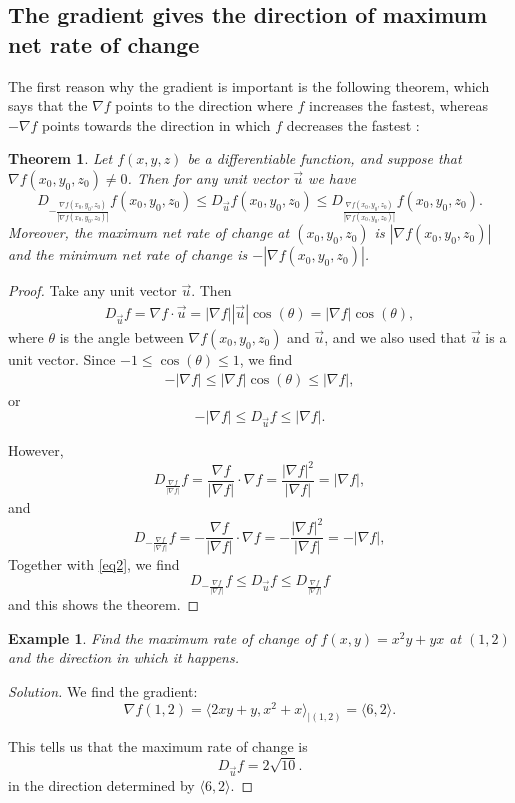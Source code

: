 \documentclass[12pt]{article}
\newenvironment{solution}
  {\begin{proof}[Solution]}
  {\end{proof}
  
  }
\newtheorem{example}{Example}
\newtheorem{theorem}{Theorem}
\renewcommand{\n}{\nabla}
\newcommand{\vu}{\vec{u}}
\newcommand{\gen}{(x_0,y_0,z_0)}
\begin{document}
\subsection*{The gradient gives the direction of maximum net rate of change}
The first reason why the gradient is important is the following theorem, which says that the $\n f$ points to the direction where $f$ increases the fastest, whereas $-\n f$ points towards the direction in which $f$ decreases the fastest :
\begin{theorem} Let $f(x,y,z)$ be a differentiable function, and suppose that $\n f(x_0,y_0,z_0)\neq 0$. Then for any unit vector $\vu$ we have $$D_{-\frac{\n f(x_0,y_0,z_0)}{|\n f(x_0,y_0,z_0)|}}f(x_0,y_0,z_0)\leq D_{\vu}f(x_0,y_0,z_0)\leq D_{\frac{\n f(x_0,y_0,z_0)}{|\n f(x_0,y_0,z_0)|}}f(x_0,y_0,z_0).$$ Moreover, the maximum net rate of change at $\gen$ is $|\n f(x_0,y_0,z_0)|$ and the minimum net rate of change is $-|\n f(x_0,y_0,z_0)|$.
\end{theorem}
\begin{proof} Take any unit vector $\vu$. Then \begin{align*}
D_{\vu}f=\n f\cdot \vu=|\n f||\vu|\cos(\theta)=|\n f|\cos(\theta),
\end{align*}
where $\theta$ is the angle between $\n f\gen$ and $\vu$, and we also used that $\vu$ is a unit vector. Since $-1\leq \cos(\theta)\leq 1$, we find
\begin{align}
-|\n f| \leq |\n f|\cos(\theta)\leq |\n f|,
\end{align} or
\begin{equation}
\label{eq2} -|\n f| \leq D_{\vu}f\leq |\n f|.
\end{equation}

However, $$D_{\frac{\n f}{|\n f|}}f=\frac{\n f}{|\n f|}\cdot\n f=\frac{|\n f|^2}{|\n f|}=|\n f|,$$ and $$D_{-\frac{\n f}{|\n f|}}f=-\frac{\n f}{|\n f|}\cdot\n f=-\frac{|\n f|^2}{|\n f|}=-|\n f|,$$
Together with \eqref{eq2}, we find  $$D_{-\frac{\n f}{|\n f|}}f\leq D_{\vu}f\leq D_{\frac{\n f}{|\n f|}}f$$ and this shows the theorem.
\end{proof}


\begin{example} Find the maximum rate of change of $f(x,y)=x^2y+yx$ at $(1,2)$ and the direction in which it happens.
\end{example}
\begin{solution} We find the gradient: $$\n f(1,2)=\langle 2xy+y,x^2+x\rangle_{|(1,2)}=\langle 6,2 \rangle.$$

This tells us that the maximum rate of change is $$D_{\vu} f=2\sqrt{10}.$$ in the direction determined by $\langle 6,2 \rangle$.
\end{solution}
\end{document}
